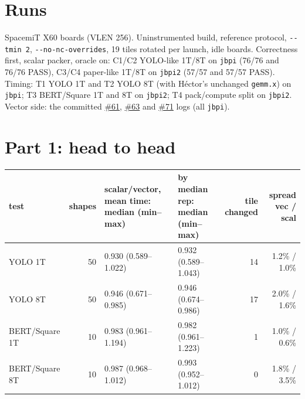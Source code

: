 \documentclass[10pt,a4paper]{article}
\newcommand{\iss}[1]{\href{https://github.com/JieGH/RVV_code_gen_via_MLIR_xDSL/issues/#1}{\##1}}
\begin{document}
\section*{Runs}
SpacemiT X60 boards (VLEN 256). Uninstrumented build, reference protocol, \texttt{-{}-tmin 2},
\texttt{-{}-no-nc-overrides}, 19 tiles rotated per launch, idle boards. Correctness first, scalar packer, oracle on:
C1/C2 YOLO-like 1T/8T on \texttt{jbpi} (76/76 and 76/76 PASS), C3/C4 paper-like 1T/8T on \texttt{jbpi2} (57/57 and
57/57 PASS). Timing: T1 YOLO 1T and T2 YOLO 8T (with H\'ector's unchanged \texttt{gemm.x}) on \texttt{jbpi};
T3 BERT/Square 1T and 8T on \texttt{jbpi2}; T4 pack/compute split on \texttt{jbpi2}. Vector side: the committed
\iss{61}, \iss{63} and \iss{71} logs (all \texttt{jbpi}).

\section*{Part 1: head to head}
\small
\begin{tabularx}{\textwidth}{@{}lrXXrr@{}}
\toprule
test & shapes & scalar/vector, mean time: median (min--max) & by median rep: median (min--max) & tile changed & spread vec / scal \\
\midrule
YOLO 1T & 50 & 0.930 (0.589--1.022) & 0.932 (0.589--1.043) & 14 & 1.2\% / 1.0\% \\
YOLO 8T & 50 & 0.946 (0.671--0.985) & 0.946 (0.674--0.986) & 17 & 2.0\% / 1.6\% \\
BERT/Square 1T & 10 & 0.983 (0.961--1.194) & 0.982 (0.961--1.223) & 1 & 1.0\% / 0.6\% \\
BERT/Square 8T & 10 & 0.987 (0.968--1.012) & 0.993 (0.952--1.012) & 0 & 1.8\% / 3.5\% \\
\bottomrule
\end{tabularx}
\end{document}
